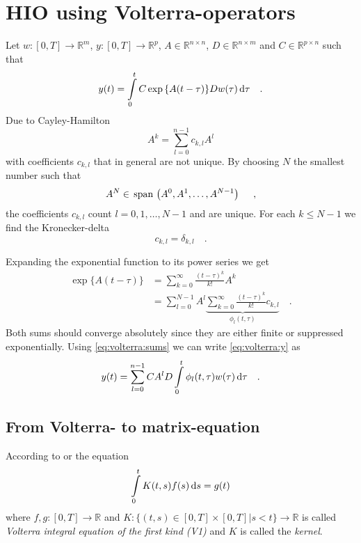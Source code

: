 \section{HIO using Volterra-operators}
Let $w:[0,T]\rightarrow \mathbb{R}^m$, $y:[0,T]\rightarrow \mathbb{R}^p$, 
$A\in \mathbb{R}^{n\times n}$, $D\in\mathbb{R}^{n\times m}$ and $C\in\mathbb{R}^{p\times n}
$ such that 
\begin{equation}
y(t) = \int\limits_0^t C \exp{\left\{A(t-\tau)\right\}} D w(\tau) \, \text{d} \tau \quad .
\label{eq:volterra:y}
\end{equation}
Due to Cayley-Hamilton
\begin{equation}
A^k = \sum\limits_{l=0}^{n-1} c_{k,l} A^l \label{eq:volterra:cayley-hamilton}
\end{equation}
with coefficients $c_{k,l}$ that in general are not unique. By choosing $N$ the 
smallest number such that
\begin{equation}
A^N \in  \, \text{span}\,\left(A^0,A^1,\ldots,A^{N-1} \right) \,\, \quad ,
\end{equation}
the coefficients $c_{k,l}$ count $l=0,1,\ldots,N-1$ and are unique. For each $k\leq 
N-1$ we find the Kronecker-delta
\begin{equation}
c_{k,l} = \delta_{k,l} \quad . \label{eq:volterra:cayley-hamilton_unique}
\end{equation}

Expanding the exponential function to its power series we get
\begin{equation}
\begin{aligned}
\exp\{ A(t-\tau) \} &= \sum\limits_{k=0}^\infty \frac{(t-\tau)^k}{k!} A^k \\
&= \sum\limits_{l=0}^{N-1}  A^l \underbrace{\sum\limits_{k=0}^\infty \frac{(t-\tau)^k}
{k!}  
c_{k,l}}_{\phi_l(t,\tau)} \quad .
\end{aligned} \label{eq:volterra:sums}
\end{equation}
Both sums should converge absolutely since they are either finite or suppressed 
exponentially. Using \eqref{eq:volterra:sums} we can write \eqref{eq:volterra:y} as
\begin{equation}
y(t) = \sum\limits_{l=0}^{n-1} CA^lD \int\limits_0^t \phi_l(t,\tau) w(\tau) \, \text{d}\tau
\quad . \label{eq:volterra:y_volterra}
\end{equation}

\subsection*{From Volterra- to matrix-equation}
\begin{definition}
According to \cite{Heuser} or \cite{Kirsch} the equation
\begin{equation}
\int\limits_0^t K(t,s) f(s) \, \text{d} s =  g(t) \label{eq:volterra:definition}
\end{equation}
where $f,g:[0,T] \rightarrow \mathbb{R}$ and $K:\{ (t,s)\in [0,T]\times [0,T] | 
s<t\}\rightarrow \mathbb{R}$ is called \textit{Volterra integral equation of the 
first kind (V1)} and $K$ is called the \textit{kernel}.
\end{definition}

